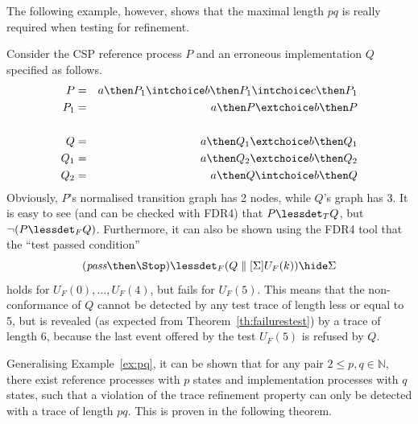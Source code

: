 The following example, however, shows that the maximal length $pq$ is really required
when testing for refinement.
\begin{example}\label{ex:pq}
Consider the CSP reference process $P$ and an erroneous implementation $Q$
specified as follows.
\begin{eqnarray*}
P & = & a \then P_1 \intchoice b \then P_1 \intchoice c \then P_1
\\
P_1 & = & a \then P \extchoice b\then P
\\ & &  \\
Q & = & a\then Q_1 \extchoice b\then Q_1
\\
Q_1 & = & a\then Q_2 \extchoice b\then Q_2
\\
Q_2 & = & a\then Q \intchoice b\then Q
\end{eqnarray*}
Obviously, $P$'s normalised transition graph has 2 nodes,
while $Q$'s graph has 3.
It is easy to see (and can be checked with FDR4) that $P\lessdet_T Q$, but
$\neg(P\lessdet_F Q)$. Furthermore, it can also be shown using the FDR4 tool that
the ``test passed condition''
\[
(\epass\then\Stop) \lessdet_F (Q\parallel[\Sigma] U_F(k))\hide \Sigma
\]
holds for $U_F(0),\dots,U_F(4)$, but fails for $U_F(5)$. This means that the
non-conformance of $Q$ cannot be detected by any test trace of length
less or equal to 5, but is revealed (as expected from Theorem~\ref{th:failurestest})
by a trace of length 6, because the last event offered by the test $U_F(5)$ is
refused by $Q$.
\xbox
\end{example}
%
Generalising Example~\ref{ex:pq}, it can be shown that for any pair
$2\le p,q \in\mathbb{N}$,
there exist reference processes with $p$ states
and implementation processes with $q$ states, such that
a violation of the trace refinement property
can only be detected with a trace of length $pq$. This is proven in the following
theorem.

